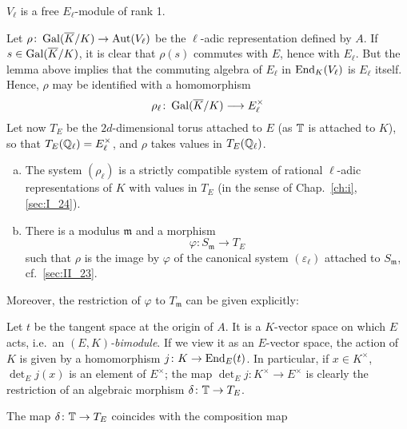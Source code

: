 \begin{lem}
	$V_\ell$ is a free $E_\ell$-module of rank 1.
\end{lem}

Let $\rho\colon \operatorname{Gal}(\overline{K}/K) \to \operatorname{Aut}(V_\ell)$ be the $\ell$-adic
representation defined by $A$. If $s \in \operatorname{Gal}(\overline{K}/K)$, it is clear that
$\rho(s)$ commutes with $E$, hence with $E_\ell$. But the lemma above implies
that the commuting algebra of $E_\ell$ in $\operatorname{End}_K(V_\ell)$ is $E_\ell$ itself.
Hence, $\rho$ may be identified with a homomorphism
\[
	\rho_\ell\colon \operatorname{Gal}(\overline{K}/K) \longrightarrow E^\times_\ell
\]
Let now $T_E$ be the $2d$-dimensional torus attached to $E$ (as $\mathbb{T}$ is
attached to $K$), so that $T_E(\mathbb{Q}_\ell) = E_\ell^\times$, and $\rho$ takes
values in $T_E(\mathbb{Q}_\ell)$.

\begin{thm}\label{thm:II_28_1}
\begin{enumerate}[(a)]
\item\label{thm:II_28_1a}
	The system $(\rho_\ell)$ is a strictly compatible system of rational
	$\ell$-adic representations of $K$ with values in $T_E$ (in the sense
	\dpage
	of Chap.~\ref{ch:i}, \ref{sec:I_24}).
\item\label{thm:II_28_1b}
	There is a modulus $\mathfrak{m}$ and a morphism
	\[
		\varphi \colon S_{\mathfrak{m}} \longrightarrow T_E
	\]
	such that $\rho$ is the image by $\varphi$ of the canonical system
	$(\varepsilon_\ell)$ attached to $S_{\mathfrak{m}}$, cf.\ 
	\ref{sec:II_23}.
\end{enumerate}
\end{thm}

Moreover, the restriction of $\varphi$ to $T_{\mathfrak{m}}$ can be given
explicitly:

Let $t$ be the tangent space at the origin of $A$. It is a $K$-vector space on
which $E$ acts, i.e.\ an \emph{$(E, K)$-bimodule}. If we view it as an
$E$-vector space, the action of $K$ is given by a homomorphism $j\colon K \to
\operatorname{End}_E(t)$. In particular, if $x \in K^\times$, $\det_E j(x)$ is an element of
$E^\times$; the map $\det_E j\colon K^\times \to E^\times$ is clearly the
restriction of an algebraic morphism $\delta\colon \mathbb{T} \to T_E$.

\begin{thm}\label{thm:II_28_2}
The map $\delta\colon \mathbb{T} \to T_E$ coincides with the composition
map 
\end{thm}

